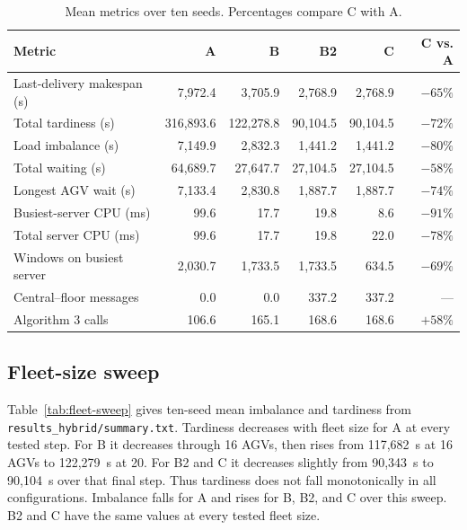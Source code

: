\documentclass[11pt]{article}
\begin{document}
\begin{table}[htbp]
\centering
\small
\caption{Mean metrics over ten seeds. Percentages compare C with A.}
\label{tab:mean-results}
\begin{tabularx}{\textwidth}{>{\raggedright\arraybackslash}Xrrrrr}
\toprule
Metric & A & B & B2 & C & C vs. A \\
\midrule
Last-delivery makespan (s) & 7,972.4 & 3,705.9 & 2,768.9 & 2,768.9 & $-65\%$ \\
Total tardiness (s) & 316,893.6 & 122,278.8 & 90,104.5 & 90,104.5 & $-72\%$ \\
Load imbalance (s) & 7,149.9 & 2,832.3 & 1,441.2 & 1,441.2 & $-80\%$ \\
Total waiting (s) & 64,689.7 & 27,647.7 & 27,104.5 & 27,104.5 & $-58\%$ \\
Longest AGV wait (s) & 7,133.4 & 2,830.8 & 1,887.7 & 1,887.7 & $-74\%$ \\
Busiest-server CPU (ms) & 99.6 & 17.7 & 19.8 & 8.6 & $-91\%$ \\
Total server CPU (ms) & 99.6 & 17.7 & 19.8 & 22.0 & $-78\%$ \\
Windows on busiest server & 2,030.7 & 1,733.5 & 1,733.5 & 634.5 & $-69\%$ \\
Central--floor messages & 0.0 & 0.0 & 337.2 & 337.2 & --- \\
Algorithm 3 calls & 106.6 & 165.1 & 168.6 & 168.6 & $+58\%$ \\
\bottomrule
\end{tabularx}
\end{table}

\subsection{Fleet-size sweep}

Table~\ref{tab:fleet-sweep} gives ten-seed mean imbalance and tardiness from
\texttt{results\_hybrid/summary.txt}. Tardiness decreases with fleet size for
A at every tested step. For B it decreases through 16 AGVs, then rises from
117,682~s at 16 AGVs to 122,279~s at 20. For B2 and C it decreases slightly
from 90,343~s to 90,104~s over that final step. Thus tardiness does not fall
monotonically in all configurations. Imbalance falls for A and rises for B,
B2, and C over this sweep. B2 and C have the same values at every tested
fleet size.
\end{document}

